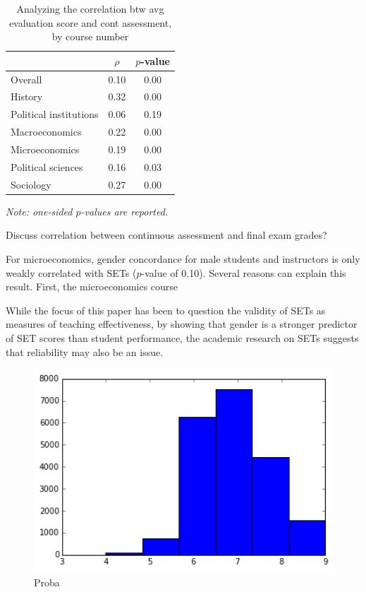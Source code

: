 \documentclass[12pt]{article}
\begin{document}
\begin{table}[htbp]
  \centering
  \footnotesize 
  \caption{Analyzing the correlation btw avg evaluation score and cont assessment, by course number}
    \begin{tabular}{lcc}
    \toprule 
                          & $\rho$  & $p$-value  \\
   \midrule
    Overall &                 0.10       & 0.00   \\
    History &                 0.32       & 0.00   \\
    Political institutions &  0.06       & 0.19     \\
    Macroeconomics &          0.22       & 0.00    \\
    Microeconomics &          0.19       & 0.00     \\
    Political sciences &      0.16       & 0.03     \\
    Sociology &               0.27       & 0.00     \\
    \bottomrule
    \end{tabular}%
 \label{tab:instructor gender}%
  
  \textit{Note: one-sided $p$-values are reported.}
\end{table}%
\normalsize



Discuss correlation between continuous assessment and final exam grades? 



For microeconomics, gender concordance for male students and instructors is only weakly correlated with SETs ($p$-value of 0.10). Several reasons can explain this result. First, the microeconomics course   


While the focus of this paper has been to question the validity of SETs as measures of teaching effectiveness, by showing that gender is a stronger predictor of SET scores than student performance, the academic research on SETs suggests that reliability may also be an issue.

\begin{figure}
\begin{centering}
  \caption{Proba}
  \includegraphics[height=3in]{reliability}
\end{centering}
\end{figure}
\end{document}
